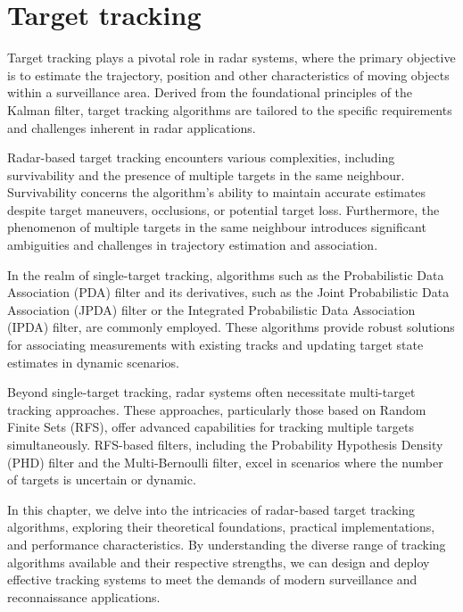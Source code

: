 
\chapter{Target tracking}
Target tracking plays a pivotal role in radar systems, where the primary objective is to estimate the trajectory,
position and other
characteristics of moving objects within a surveillance area. Derived from the foundational principles of the Kalman filter, target tracking algorithms are tailored to the specific requirements and challenges inherent in radar applications.

Radar-based target tracking encounters various complexities, including survivability and the presence of
multiple targets in the same neighbour. Survivability concerns the algorithm's ability to maintain
accurate estimates despite target maneuvers, occlusions, or potential target loss. Furthermore, the phenomenon of
multiple targets in the same neighbour introduces significant ambiguities and challenges in trajectory estimation and
association.

In the realm of single-target tracking, algorithms such as the Probabilistic Data Association (PDA) filter and its derivatives, such as the Joint Probabilistic Data Association (JPDA) filter or the Integrated Probabilistic Data Association (IPDA) filter, are commonly employed. These algorithms provide robust solutions for associating measurements with existing tracks and updating target state estimates in dynamic scenarios.

Beyond single-target tracking, radar systems often necessitate multi-target tracking approaches. These approaches,
particularly those based on Random Finite Sets (RFS), offer advanced capabilities for tracking multiple targets simultaneously. RFS-based filters, including the Probability Hypothesis Density (PHD) filter and the Multi-Bernoulli filter, excel in scenarios where the number of targets is uncertain or dynamic.

In this chapter, we delve into the intricacies of radar-based target tracking algorithms, exploring their theoretical foundations, practical implementations, and performance characteristics. By understanding the diverse range of tracking algorithms available and their respective strengths, we can design and deploy effective tracking systems to meet the demands of modern surveillance and reconnaissance applications.

